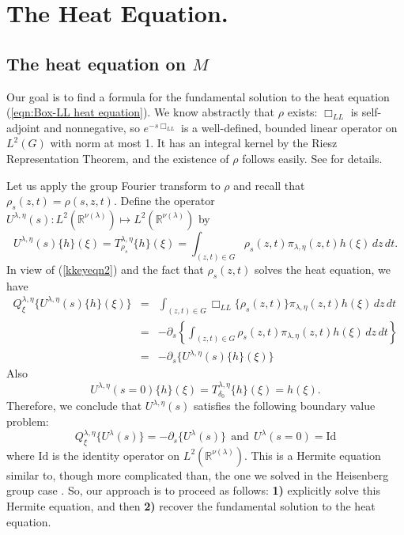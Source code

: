 \documentclass[12pt,reqno]{amsart}
\theoremstyle{definition}
\begin{document}
\section{The Heat Equation.} \label{sec:heat equation and Group F.T.}
\subsection{The heat equation on $M$}
Our goal is to find a formula for the fundamental solution to the 
heat equation (\ref{eqn:Box-LL heat equation}).
We know abstractly that $\rho$ exists: $\Box_{LL}$ is self-adjoint and nonnegative, so $e^{-s\Box_{LL}}$ is a well-defined, bounded linear operator
on $L^2(G)$ with norm at most 1. It has an integral kernel by the Riesz Representation Theorem, and the existence of $\rho$ follows easily. See
\cite{Rai06h} for details.

Let us apply the group Fourier transform to $\rho$ and recall that $\rho_s(z,t) = \rho(s,z,t)$.
Define the operator $U^{\lambda,\eta} (s): L^2({\mathbb{R}}^{\nu(\lambda)}) \mapsto L^2({\mathbb{R}}^{\nu(\lambda)})$ by
\begin{equation}
\label{Ulambda}
U^{\lambda,\eta} (s) \{h\}  (\xi) = T_{\rho_s}^{\lambda,\eta} \{h\}(\xi)
=  \int_{(z,t) \in G} \rho_s (z,t) \pi_{\lambda,\eta} (z,t) h(\xi) \, dz\, dt.
\end{equation}
In view of (\ref{kkeyeqn2}) and the fact that 
$\rho_s (z,t)$ solves the heat equation, we have
\begin{eqnarray*}
Q_\xi^{\lambda,\eta} \{ U^{\lambda,\eta}(s) \{h\} (\xi) \}
&=& \int_{(z,t) \in G} \Box_{LL} \{ \rho_s (z,t) \}
\pi_{\lambda,\eta} (z,t) h(\xi) \, dz\, dt \\
&=& - {\partial}_s \left\{ \int_{(z,t) \in G}  \rho_s (z,t) 
\pi_{\lambda,\eta} (z,t) h(\xi) \, dz\, dt \right\} \\
&=& -{\partial}_s \big\{ U^{\lambda,\eta}(s) \{h\} (\xi) \big\}
\end{eqnarray*}
Also
\[
U^{\lambda,\eta}(s=0)\{h\}(\xi) =  T_{\delta_0 }^{\lambda,\eta} \{h\}(\xi) = h(\xi).
\]
Therefore, we conclude that $U^{\lambda,\eta}(s) $ satisfies
the following boundary value problem:
\begin{equation}
\label{hermitediffeq}
Q_\xi^{\lambda,\eta} \{ U^\lambda (s) \} = -{\partial}_s \{ U^\lambda (s) \} 
\ \ \textrm{and} \ \ U^\lambda (s=0) = \textrm{Id}
\end{equation}
where $\textrm{Id}$ is the identity operator on $L^2({\mathbb{R}}^{\nu(\lambda)})$.
This is a Hermite equation similar to, though more complicated than, the one we solved
in the Heisenberg group case \cite{BoRa09}.
So, our approach is to proceed as follows: \textbf{1)} 
explicitly solve this Hermite equation, and then \textbf{2)}  recover
the fundamental solution to the heat equation.
\end{document}

